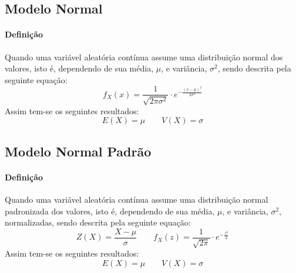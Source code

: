 \documentclass{article}
\begin{document}
        \subsection{Modelo Normal}
            \paragraph{Definição}Quando uma variável aleatória contínua assume uma distribuição normal dos valores, isto é, dependendo de sua média, $\mu$, e variância, $\sigma^{2}$, sendo descrita pela seguinte equação:
                \begin{equation}
                    \boxed{
                        f_{X}(x) = 
                        \frac{1}{\sqrt{2\pi \sigma^{2}}} \cdot 
                        e^{-\frac{(x -\mu)^{2}}{2\sigma^{2}}}
                    }
                \end{equation}
            Assim tem-se os seguintes resultados:
                \begin{equation}
                    \boxed{
                        E(X) = \mu
                    }
                    \qquad
                    \boxed{
                        V(X) = \sigma
                    }
                \end{equation}

        \subsection{Modelo Normal Padrão}
            \paragraph{Definição}Quando uma variável aleatória contínua assume uma distribuição normal padronizada dos valores, isto é, dependendo de sua média, $\mu$, e variância, $\sigma^{2}$, normalizadas, sendo descrita pela seguinte equação:
                \begin{equation}
                    \boxed{
                        Z(X) = \frac{X - \mu}{\sigma}
                    }
                    \qquad
                    \boxed{
                        f_{X}(z) = 
                        \frac{1}{\sqrt{2\pi}} \cdot 
                        e^{-\frac{z^{2}}{2}}
                    }
                \end{equation}
            Assim tem-se os seguintes resultados:
                \begin{equation}
                    \boxed{
                        E(X) = \mu
                    }
                    \qquad
                    \boxed{
                        V(X) = \sigma
                    }
                \end{equation}
\end{document}
